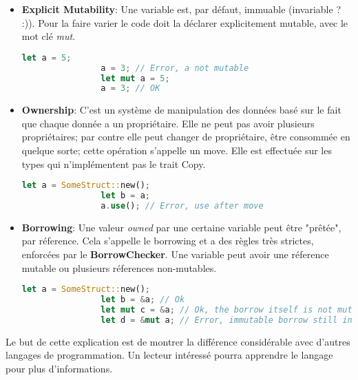         
        \begin{itemize}
            \renewcommand{\labelitemi}{$\bullet$}
            \item \textbf{Explicit Mutability}: Une variable est, par défaut,
            immuable (invariable ? :)). Pour la faire varier le code doit la
            déclarer explicitement mutable, avec le mot clé \textit{mut}.
            \begin{lstlisting}[autogobble, language=Rust, style=boxed]
                let a = 5;
                a = 3; // Error, a not mutable
                let mut a = 5;
                a = 3; // OK
            \end{lstlisting}

            \item \textbf{Ownership}: C'est un système de manipulation des données basé
            sur le fait que chaque donnée a un propriétaire. Elle ne peut pas avoir
            plusieurs propriétaires; par contre elle peut changer de propriétaire,
            être consommée en quelque sorte; cette opération s'appelle un move.
            Elle est effectuée sur les types qui n'implémentent pas le trait Copy.
            \begin{lstlisting}[autogobble, language=Rust, style=boxed]
                let a = SomeStruct::new();
                let b = a;
                a.use(); // Error, use after move
            \end{lstlisting}

            \item \textbf{Borrowing}: Une valeur \textit{owned} par une certaine variable
            peut être "prêtée", par réference. Cela s'appelle le borrowing
            et a des règles très strictes, enforcées par le \textbf{BorrowChecker}.
            Une variable peut avoir une réference mutable ou plusieurs réferences
            non-mutables.
            \begin{lstlisting}[autogobble, language=Rust, style=boxed]
                let a = SomeStruct::new();
                let b = &a; // Ok
                let mut c = &a; // Ok, the borrow itself is not mutable
                let d = &mut a; // Error, immutable borrow still in context
            \end{lstlisting}
        \end{itemize}
        \bigskip
        Le but de cette explication est de montrer la différence considérable
        avec d'autres langages de programmation. Un lecteur intéressé pourra
        apprendre le langage pour plus d'informations.


